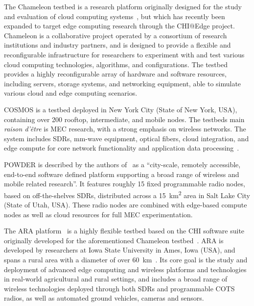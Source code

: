 The Chameleon testbed is a research platform originally designed for the study and evaluation of cloud computing systems~\cite{keahey2020lessons}, but which has recently been expanded to target edge computing research through the \acs{CHI}@Edge project.
Chameleon is a collaborative project operated by a consortium of research institutions and industry partners, and is designed to provide a flexible and reconfigurable infrastructure for researchers to experiment with and test various cloud computing technologies, algorithms, and configurations.
The testbed provides a highly reconfigurable array of hardware and software resources, including servers, storage systems, and networking equipment, able to simulate various cloud and edge computing scenarios.

\gls{COSMOS} is a testbed deployed in New York City (State of New York, \gls{USA}), containing over \num{200} rooftop, intermediate, and mobile nodes.
The testbeds main \emph{raison d'être} is \gls{MEC} research, with a strong emphasis on wireless networks.
The system includes \glspl{SDR}, \si{\milli\meter}-wave equipment, optical fibers, cloud integration, and edge compute for core network functionality and application data processing~\cite{yu2019cosmos,raychaudhuri2020challenge}.

\gls{POWDER} is described by the authors of~\cite{breen2020powder} as a ``city-scale, remotely accessible, end-to-end software defined platform supporting a broad range of wireless and mobile related research''.
It features roughly \num{15} fixed programmable radio nodes, based on off-the-shelves \glspl{SDR}, distributed across a \SI{15}{\kilo\meter\squared} area in Salt Lake City (State of Utah, \gls{USA}).
These radio nodes are combined with edge-based compute nodes as well as cloud resources for full \gls{MEC} experimentation.

The \gls{ARA} platform~\cite{zhang2022ara} is a highly flexible testbed based on the \gls{CHI} software suite originally developed for the aforementioned Chameleon testbed~\cite{keahey2020lessons}.
\gls{ARA} is developed by researchers at Iowa State University in Ames, Iowa (\gls{USA}), and spans a rural area with a diameter of over \SI{60}{\kilo\meter}~\cite{zhang2022ara}.
Its core goal is the study and deployment of advanced edge computing and wireless platforms and technologies in real-world agricultural and rural settings, and includes a broad range of wireless technologies deployed through both \glspl{SDR} and programmable \gls{COTS} radios, as well as automated ground vehicles, cameras and sensors.

